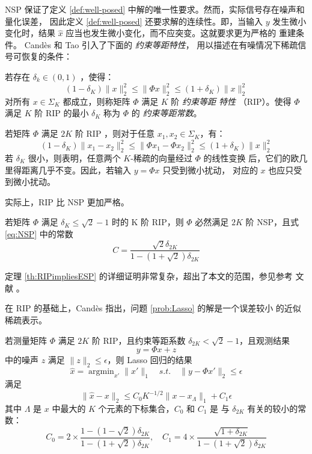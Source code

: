 NSP 保证了定义
\ref{def:well-posed} 中解的唯一性要求。然而，实际信号存在噪声和量化误差，
因此定义 \ref{def:well-posed} 还要求解的连续性。即，当输入 $y$ 发生微小
变化时，结果 $\hat x$ 应当也发生微小变化，而不应突变。这就要求更为严格的
重建条件。 Cand\`es 和 Tao 引入了下面的 \emph{约束等距特性}，
用以描述在有噪情况下稀疏信号可恢复的条件：
\begin{definition}[约束等距特性] 若存在 $\delta_k \in (0,1)$ ，使得：
\begin{equation}
(1 - \delta_K) \|x\|_2^2 \leq \|\Phi x\|_2^2 \leq (1 + \delta_K) \|x\|_2^2
\end{equation}
对所有 $x \in \Sigma_K$ 都成立，则称矩阵 $\Phi$ 满足 $K$ 阶 \emph{约束等距
特性} （RIP）。使得 $\Phi$ 满足 $K$ 阶 RIP 的最小 $\delta_K$ 称为
$\Phi$ 的 \emph{约束等距常数}。
\end{definition}

若矩阵 $\Phi$ 满足 $2K$ 阶 RIP ，则对于任意 $x_1, x_2 \in \Sigma_K$，有：
\begin{equation}
(1 - \delta_K) \|x_1 - x_2\|_2^2 \leq \|\Phi x_1 - \Phi x_2\|_2^2
\leq (1 + \delta_K) \|x\|_2^2
\end{equation}
若 $\delta_K$ 很小，则表明，任意两个 $K$-稀疏的向量经过 $\Phi$ 的线性变换
后，它们的欧几里得距离几乎不变。因此，若输入 $y = \Phi x$ 只受到微小扰动，
对应的 $x$ 也应只受到微小扰动。

实际上，RIP 比 NSP 更加严格。
\begin{theorem} \label{th:RIPimpliesESP}
若矩阵 $\Phi$ 满足 $\delta_K \leq \sqrt{2} - 1$ 时的 K 阶 RIP，则
$\Phi$ 必然满足 $2K$ 阶 NSP，且式 \ref{eq:NSP} 中的常数
\begin{equation}
C = \frac{\sqrt{2} \delta_{2K}}{1 - (1 + \sqrt{2}) \delta_{2K}}
\end{equation}
\end{theorem}

定理 \ref{th:RIPimpliesESP} 的详细证明非常复杂，超出了本文的范围，参见参考
文献 \cite{IntroCS}。

在 RIP 的基础上，Cand\`es 指出，问题 \ref{prob:Lasso} 的解是一个误差较小
的近似稀疏表示。
\begin{theorem} \label{th:l1recovery}
若测量矩阵 $\Phi$ 满足 $2K$ 阶 RIP，且约束等距系数 $\delta_{2K} < 
\sqrt{2} - 1$，且观测结果
\begin{equation} \label{eqn:observe}
y = \Phi x + z
\end{equation}
中的噪声 $z$ 满足 $\|z\|_2 \leq \epsilon$，则 Lasso 回归的结果
\begin{equation}
\hat x = \mathop{\arg\min}_{x'} \|x'\|_1 \quad s.t. \quad \|y-\Phi x'\|_2
\leq \epsilon
\end{equation}
满足
\begin{equation}
\|\hat x - x\|_2 \leq C_0 K^{-1/2} \|x - x_{\Lambda}\|_1 + C_1 \epsilon
\end{equation}
其中 $\Lambda$ 是 $x$ 中最大的 $K$ 个元素的下标集合，$C_0$ 和 $C_1$ 是
与 $\delta_{2K}$ 有关的较小的常数：
\begin{equation}
C_0 = 2 \times \frac{1 - (1-\sqrt{2}) \delta_{2K}}{1 - (1+\sqrt{2})
\delta_{2K}}, \quad C_1 = 4 \times \frac{\sqrt{1 + \delta_{2K}}}
{1 - (1 + \sqrt{2}) \delta_{2K}}
\end{equation}
\end{theorem}

